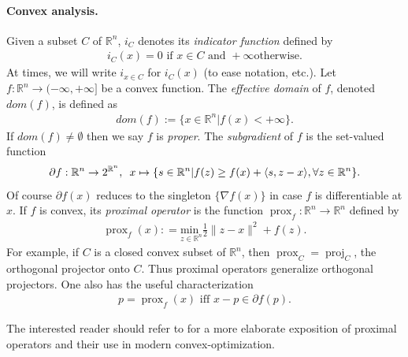 \documentclass{article} %
\DeclareMathOperator{\proj}{proj}
\DeclareMathOperator{\prox}{prox}
\begin{document}
\paragraph{\textbf{Convex analysis.}}
Given a subset $C$ of $\mathbb{R}^n$,
$i_C$ denotes its \textit{indicator function} defined by
\begin{eqnarray}
  i_C(x) = 0 \text{ if } x \in C\text{ and }+\infty\text{
    otherwise.}
\end{eqnarray}
At times, we will write $i_{x \in C}$ for $i_C(x)$ (to ease notation,
etc.). Let $f : \mathbb{R}^n \rightarrow (-\infty, +\infty]$ be a
  convex function. The \textit{effective domain} of $f$, denoted
  $dom(f)$, is defined as
\begin{eqnarray}
  dom(f) := \{x \in \mathbb{R}^n | f(x) < +\infty\}.
\end{eqnarray}
 If $dom(f) \ne \emptyset$ then we say $f$ is \textit{proper}.
The \textit{subgradient} of $f$ is the set-valued function
\begin{eqnarray}
\partial f: \mathbb{R}^n \rightarrow 2^{\mathbb{R}^n}, \hspace{.5em} x \mapsto
\{s\in \mathbb{R}^n | f(z)  \ge f(x) + \langle s, z - x\rangle, \forall
z \in \mathbb{R}^n\}.
\end{eqnarray}
Of course $\partial f(x)$ reduces to the singleton $\{\nabla f(x)\}$
in case $f$ is differentiable at $x$. If $f$ is convex, its
\textit{proximal operator} is the function $\prox_f: \mathbb{R}^n
\rightarrow \mathbb{R}^n$ defined by
\begin{eqnarray}
  \prox_f(x): = \underset{z \in \mathbb{R}^n}{\text{min }}\frac{1}{2}\|z
  - x\|^2 + f(z).
\end{eqnarray}
For example, if $C$ is a closed convex subset of $\mathbb{R}^n$, then
$\prox_C = \proj_C$, the orthogonal projector onto $C$. Thus proximal
operators generalize orthogonal projectors. One also has the useful
characterization
\begin{eqnarray}
  p = \prox_f(x)\text{ iff } x - p \in \partial f(p).
\end{eqnarray}

The interested reader should refer to \cite{combettes2011proximal} for
a more elaborate exposition of proximal operators and their
use in modern convex-optimization.
\end{document}
